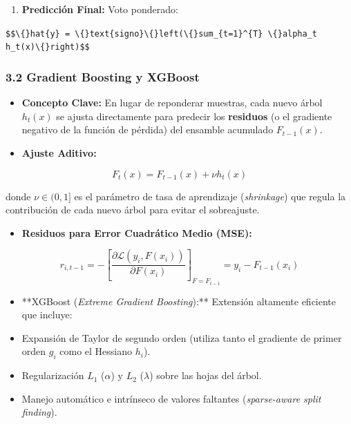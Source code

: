 \documentclass[11pt,oneside]{article}
\begin{document}
\begin{enumerate}

\item \textbf{Predicción Final:} Voto ponderado:

\end{enumerate}

\texttt{\$\$\textbackslash\{\}hat\{y\} = \textbackslash\{\}text\{signo\}\textbackslash\{\}left(\textbackslash\{\}sum\_\{t=1\}\textasciicircum{}\{T\} \textbackslash\{\}alpha\_t h\_t(x)\textbackslash\{\}right)\$\$}\\

\subsubsection{3.2 Gradient Boosting y XGBoost}

\begin{itemize}

\item \textbf{Concepto Clave:} En lugar de reponderar muestras, cada nuevo árbol \(h_t(x)\) se ajusta directamente para predecir los \textbf{residuos} (o el gradiente negativo de la función de pérdida) del ensamble acumulado \(F_{t-1}(x)\).

\item \textbf{Ajuste Aditivo:}

\end{itemize}

\[F_t(x) = F_{t-1}(x) + \nu h_t(x)\]

  donde \(\nu \in (0, 1]\) es el parámetro de tasa de aprendizaje (\emph{shrinkage}) que regula la contribución de cada nuevo árbol para evitar el sobreajuste.

\begin{itemize}

\item \textbf{Residuos para Error Cuadrático Medio (MSE):}

\end{itemize}

\[r_{i, t-1} = -\left[ \frac{\partial \mathcal{L}(y_i, F(x_i))}{\partial F(x_i)} \right]_{F = F_{t-1}} = y_i - F_{t-1}(x_i)\]

\begin{itemize}

\item **XGBoost (\emph{Extreme Gradient Boosting}):** Extensión altamente eficiente que incluye:

\item Expansión de Taylor de segundo orden (utiliza tanto el gradiente de primer orden \(g_i\) como el Hessiano \(h_i\)).

\item Regularización \(L_1\) (\(\alpha\)) y \(L_2\) (\(\lambda\)) sobre las hojas del árbol.

\item Manejo automático e intrínseco de valores faltantes (\emph{sparse-aware split finding}).

\end{itemize}
\end{document}
